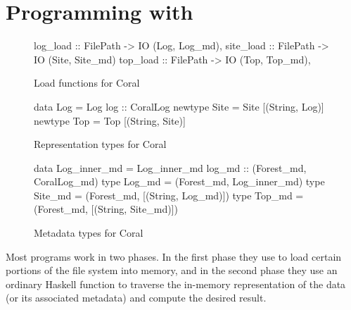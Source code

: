 \section{Programming with \forest{}}
\label{sec:exp}

\begin{figure}
\begin{code}
log_load :: FilePath -> IO (Log, Log_md),
site_load :: FilePath -> IO (Site, Site_md)
top_load :: FilePath -> IO (Top, Top_md),
\end{code}
\caption{Load functions for Coral}
\label{fig:coral-load}
\end{figure}

\begin{figure}
\begin{code}
data Log = Log { log :: CoralLog }
newtype Site = Site [(String, Log)]
newtype Top = Top [(String, Site)]
\end{code}
\caption{Representation types for Coral}
\label{fig:coral-rep}
\end{figure}

\begin{figure}
\begin{code}
data Log_inner_md = 
  Log_inner_md { log_md :: (Forest_md, CoralLog_md) }
type Log_md = (Forest_md, Log_inner_md)
type Site_md = (Forest_md, [(String, Log_md)])
type Top_md = (Forest_md, [(String, Site_md)])
\end{code}
\caption{Metadata types for Coral}
\label{fig:coral-md}
\end{figure}



Most \forest{} programs work in two phases. In the first phase they
use \forest{} to load certain portions of the file system into memory,
and in the second phase they use an ordinary Haskell function to
traverse the in-memory representation of the data (or its associated
metadata) and compute the desired result.

